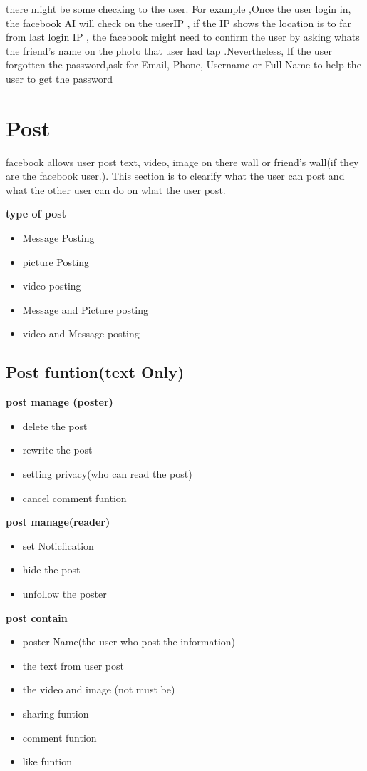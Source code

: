 there might be some checking to the user. For example ,Once the user login in,
the facebook AI will check on the userIP , if the IP shows the location is to
far from last login IP , the facebook might need to confirm the user by asking
whats the friend's name on the photo that user had tap .Nevertheless, If the
user forgotten the password,ask for Email, Phone, Username or Full Name to help
the user to get the password

\section{Post}
facebook allows user post text, video, image on there wall or friend's wall(if
they are the facebook user.). This section is to clearify what the user can post
and what the other user can do on what the user post.


\textbf{type of post}
\begin{itemize}
\item Message Posting 
\item picture Posting
\item video posting
\item Message and Picture posting
\item video and Message posting
\end{itemize}


\subsection{Post funtion(text Only)}

\textbf{post manage (poster)}
\begin{itemize}
\item delete the post
\item rewrite the post
\item setting privacy(who can read the post)
\item cancel comment funtion
\end{itemize}

\textbf{post manage(reader)}
\begin{itemize}
\item set Noticfication
\item hide the post 
\item unfollow the poster
\end{itemize}

\textbf{post contain}
\begin{itemize}
\item poster Name(the user who post the information)
\item the text from user post
\item the video and image (not must be)
\item sharing funtion
\item comment funtion
\item like funtion
\end{itemize}


